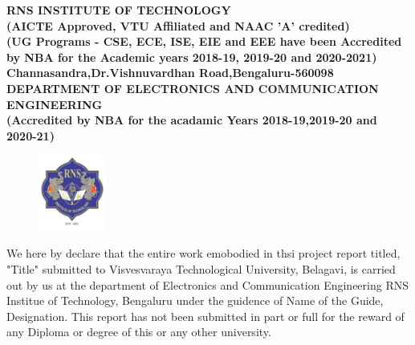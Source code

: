 %
\setlength{\toptafiddle}{1in}
\setlength{\bottafiddle}{1in}
\vspace*{-0.5in}
\enlargethispage{\bottafiddle}
\thispagestyle{empty}


\begin{center}
\small\textbf{	RNS INSTITUTE OF TECHNOLOGY\\
(AICTE Approved, VTU Affiliated and NAAC 'A' credited)\\
(UG Programs - CSE, ECE, ISE, EIE and EEE have been Accredited by NBA for the Academic years 2018-19, 2019-20 and 2020-2021)\\
Channasandra,Dr.Vishnuvardhan Road,Bengaluru-560098\\
\vspace{0.3cm}
DEPARTMENT OF ELECTRONICS AND COMMUNICATION ENGINEERING\\
(Accredited by NBA for the acadamic Years 2018-19,2019-20 and 2020-21)
}
\end{center}

\begin{center}
\begin{figure}[h]
\centering
\includegraphics[height=2.5cm]{images/rns1.jpg}
\end{figure}
\Large{\textbf{\color{red}{DECLARATION}}}
\end{center}

We here by declare that the entire work emobodied in thsi project report titled, {\color{red}"Title"} submitted to {\color{red}Visvesvaraya Technological University}, Belagavi, is carried out by us at the department of {\color{blue}Electronics and Communication Engineering} RNS Institue of Technology, Bengaluru under the guidence of {\color{blue}Name of the Guide}, Designation. This report has not been submitted in part or full for the reward of any Diploma or degree of this or any other university.


